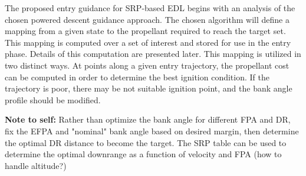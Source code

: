 \documentclass[letterpaper, preprint, paper,11pt]{AAS}
\begin{document}

The proposed entry guidance for SRP-based EDL begins with an analysis of the chosen powered descent guidance approach. The chosen algorithm will define a mapping from a given state to the propellant required to reach the target set. This mapping is computed over a set of interest and stored for use in the entry phase. Details of this computation are presented later. This mapping is utilized in two distinct ways. At points along a given entry trajectory, the propellant cost can be computed in order to determine the best ignition condition. If the trajectory is poor, there may be not suitable ignition point, and the bank angle profile should be modified.

\textbf{Note to self:} Rather than optimize the bank angle for different FPA and DR, fix the EFPA and "nominal" bank angle based on desired margin, then determine the optimal DR distance to become the target.  The SRP table can be used to determine the optimal downrange as a function of velocity and FPA (how to handle altitude?)


\end{document}
